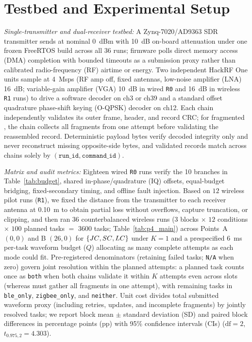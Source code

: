\section{Testbed and Experimental Setup}\label{sec:methodology}

\emph{Single-transmitter and dual-receiver testbed:} A Zynq-7020/AD9363 SDR transmitter sends at nominal \SI{0}{dBm} with \SI{10}{dB} on-board attenuation under one frozen FreeRTOS \proto{} build across all 36 runs; firmware polls direct memory access (DMA) completion with bounded timeouts as a submission proxy rather than calibrated radio-frequency (RF) airtime or energy. Two independent HackRF One units sample at \SI{4}{Msps} (RF amp off, fixed antennas, low-noise amplifier (LNA) \SI{16}{dB}; variable-gain amplifier (VGA) \SI{10}{dB} in wired \texttt{R0} and \SI{16}{dB} in wireless \texttt{R1} runs) to drive a software \ble{} decoder on ch3 or ch39 and a standard offset quadrature phase-shift keying (O-QPSK) \stdfour{} decoder on ch12. Each chain independently validates its outer frame, \proto{} header, and record CRC; for fragmented \modelc{}, the \ble{} chain collects all \fragproto{} fragments from one attempt before validating the reassembled record. Deterministic payload bytes verify decoded integrity only and never reconstruct missing opposite-side bytes, and validated records match across chains solely by $(\texttt{run\_id},\texttt{command\_id})$.



\emph{Matrix and audit metrics:} Eighteen wired \texttt{R0} runs verify the 10 branches in Table~\ref{tab:budget}, shared in-phase/quadrature (IQ) offsets, equal-budget bridging, fixed-secondary timing, and offline fault injection. Based on $12$ wireless pilot runs (\texttt{R1}), we fixed the distance from the transmitter to each receiver antenna at \SI{0.10}{m} to obtain partial loss without overflows, capture truncation, or clipping, and then ran $36$ counterbalanced wireless runs ($3$ blocks $\times$ $12$ conditions $\times$ $100$ planned tasks $=$ \num{3600} tasks; Table~\ref{tab:p4_main}) across Points~A $(0,0)$ and B $(26,0)$ for $\{JC{},SC{},LC{}\}$ under $K{=}1$ and a prespecified \SI{6}{ms} per-task waveform budget ($Q$) allocating as many complete attempts as each mode could fit. Pre-registered denominators (retaining failed tasks; \texttt{N/A} when zero) govern joint resolution within the planned attempts: a planned task counts once as \texttt{both} when both chains validate it within $K$ attempts even across slots (whereas \modelc{} must gather all \fragproto{} fragments in one attempt), with remaining tasks in \texttt{ble\_only}, \texttt{zigbee\_only}, and \texttt{neither}. Unit cost divides total submitted waveform proxy (including retries, updates, and incomplete fragments) by jointly resolved tasks; we report block mean $\pm$ standard deviation (SD) and paired block differences in percentage points (pp) with 95\% confidence intervals (CIs) ($\text{df}{=}2$, $t_{0.975,2}{=}4.303$).
